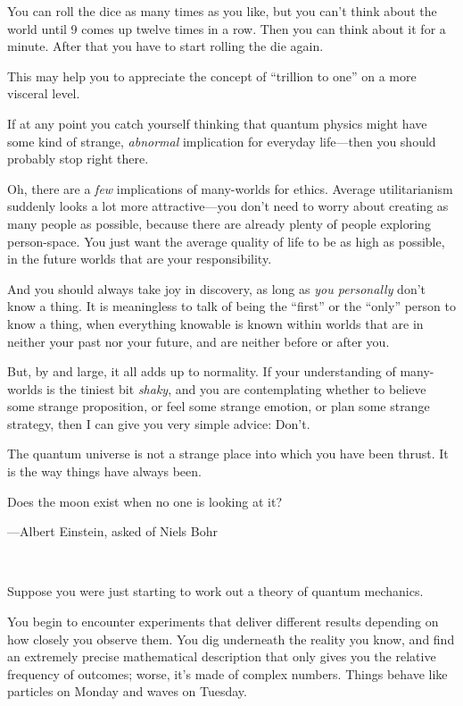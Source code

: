 {
 You can roll the dice as many times as you like, but you
can't think about the world until 9 comes up twelve
times in a row. Then you can think about it for a minute. After that
you have to start rolling the die again.}

{
 This may help you to appreciate the concept of
``trillion to one'' on a more
visceral level.}

{
 If at any point you catch yourself thinking that quantum physics
might have some kind of strange, \textit{abnormal} implication for
everyday life---then you should probably stop right there.}

{
 Oh, there are a \textit{few} implications of many-worlds for
ethics. Average utilitarianism suddenly looks a lot more
attractive---you don't need to worry about creating as
many people as possible, because there are already plenty of people
exploring person-space. You just want the average quality of life to be
as high as possible, in the future worlds that are your
responsibility.}

{
 And you should always take joy in discovery, as long as
\textit{you personally} don't know a thing. It is
meaningless to talk of being the
``first'' or the
``only'' person to know a thing,
when everything knowable is known within worlds that are in neither
your past nor your future, and are neither before or after you.}

{
 But, by and large, it all adds up to normality. If your
understanding of many-worlds is the tiniest bit \textit{shaky}, and you
are contemplating whether to believe some strange proposition, or feel
some strange emotion, or plan some strange strategy, then I can give
you very simple advice: Don't.}

{
 The quantum universe is not a strange place into which you have
been thrust. It is the way things have always been.}

\myendsectiontext


\bigskip


{
 Does the moon exist when no one is looking at it?}

{\raggedleft
 {}---Albert Einstein, asked of Niels Bohr
\par}


\bigskip

{
 ~}

{
 Suppose you were just starting to work out a theory of quantum
mechanics.}

{
 You begin to encounter experiments that deliver different results
depending on how closely you observe them. You dig underneath the
reality you know, and find an extremely precise mathematical
description that only gives you the relative frequency of outcomes;
worse, it's made of complex numbers. Things behave like
particles on Monday and waves on Tuesday.}

